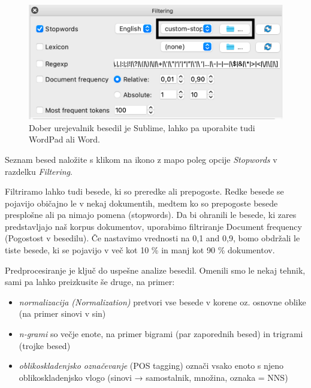 \begin{figure}[h]
  \centering
  \includegraphics[width=\linewidth]{stop-words.png}%
  \caption{Dober urejevalnik besedil je Sublime, lahko pa uporabite tudi WordPad ali Word.}
  \label{fig:002-stop-words}
\end{figure}

Seznam besed naložite s klikom na ikono z mapo poleg opcije \textit{Stopwords} v razdelku \textit{Filtering}.

Filtriramo lahko tudi besede, ki so preredke ali prepogoste. Redke besede se pojavijo običajno le v nekaj dokumentih, medtem ko so prepogoste besede presplošne ali pa nimajo pomena (stopwords). Da bi ohranili le besede, ki zares predstavljajo naš korpus dokumentov, uporabimo filtriranje Document frequency (Pogostost v besedilu). Če nastavimo vrednosti na 0,1 and 0,9, bomo obdržali le tiste besede, ki se pojavijo v več kot 10 \% in manj kot 90 \% dokumentov.

Predprocesiranje je ključ do uspešne analize besedil. Omenili smo le nekaj tehnik, sami pa lahko preizkusite še druge, na primer:

\begin{itemize}

\item \textit{normalizacija (Normalization)} pretvori vse besede v korene oz. osnovne oblike (na primer sinovi v sin)
\item \textit{n-grami} so večje enote, na primer bigrami (par zaporednih besed) in trigrami (trojke besed)
\item \textit{oblikoskladenjsko označevanje} (POS tagging) označi vsako enoto s njeno oblikoskladenjsko vlogo (sinovi → samostalnik, množina, oznaka = NNS)

\end{itemize}

